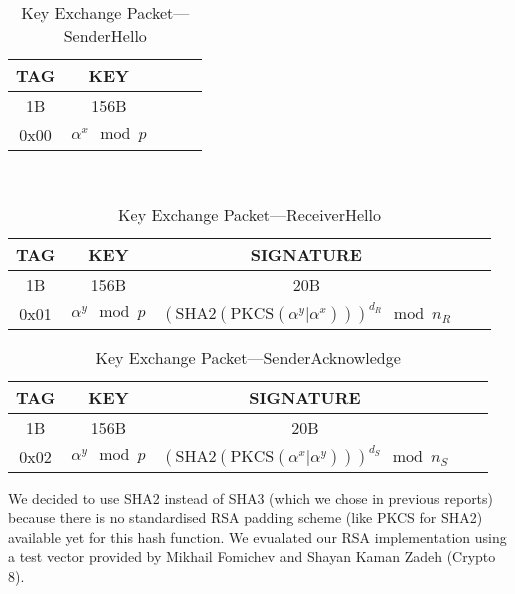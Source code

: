 \documentclass[a4paper]{article}
\begin{document}
\begin{table}[H]
    \begin{center}
        \begin{tabular}{| c | c | c | c | c |}
            \hline
            TAG & KEY \\ \hline
            1B & 156B \\ \hline
            0x00 & $\alpha^x\mod{p}$ \\
            \hline
        \end{tabular}
    \end{center}
    \
    \caption{Key Exchange Packet---SenderHello}
    \label{tab:key_exchange_packet_senderhello}
\end{table}
\begin{table}[H]
    \begin{center}
        \begin{tabular}{| c | c | c | c | c |}
            \hline
            TAG & KEY & SIGNATURE \\ \hline
            1B & 156B & 20B \\ \hline
            0x01 & $\alpha^y\mod{p}$ & $\left(\text{SHA2}\left(\text{PKCS}\left(\alpha^y \big| \alpha^x \right)\right)\right)^{d_R}\mod{n_R}$\\
            \hline
        \end{tabular}
    \end{center}
    
    \caption{Key Exchange Packet---ReceiverHello}
    \label{tab:key_exchange_packet_receiverhello}
\end{table}
\begin{table}[H]
    \begin{center}
        \begin{tabular}{| c | c | c | c | c |}
            \hline
            TAG & KEY & SIGNATURE \\ \hline
            1B & 156B & 20B \\ \hline
            0x02 & $\alpha^y\mod{p}$ & $\left(\text{SHA2}\left(\text{PKCS}\left(\alpha^x \big| \alpha^y \right)\right)\right)^{d_S}\mod{n_S}$\\
            \hline
        \end{tabular}
    \end{center}
    
    \caption{Key Exchange Packet---SenderAcknowledge}
    \label{tab:key_exchange_packet_senderacknowledge}
\end{table}

We decided to use SHA2 instead of SHA3 (which we chose in previous reports) because there is no standardised RSA padding scheme (like PKCS for SHA2) available yet for this hash function. We evualated our RSA implementation using a test vector provided by Mikhail Fomichev and Shayan Kaman Zadeh (Crypto 8).
\end{document}
